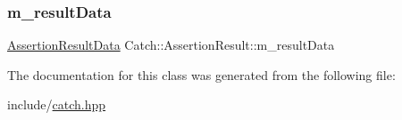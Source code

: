 \mbox{\label{class_catch_1_1_assertion_result_add3455b8bbedb0d643e18da67c66b4f7}} 
\subsubsection{\texorpdfstring{m\+\_\+result\+Data}{m\_resultData}}
{\footnotesize\ttfamily \mbox{\hyperlink{struct_catch_1_1_assertion_result_data}{Assertion\+Result\+Data}} Catch\+::\+Assertion\+Result\+::m\+\_\+result\+Data\hspace{0.3cm}{\ttfamily [protected]}}



The documentation for this class was generated from the following file\+:\begin{DoxyCompactItemize}
\item 
include/\mbox{\hyperlink{catch_8hpp}{catch.\+hpp}}\end{DoxyCompactItemize}
